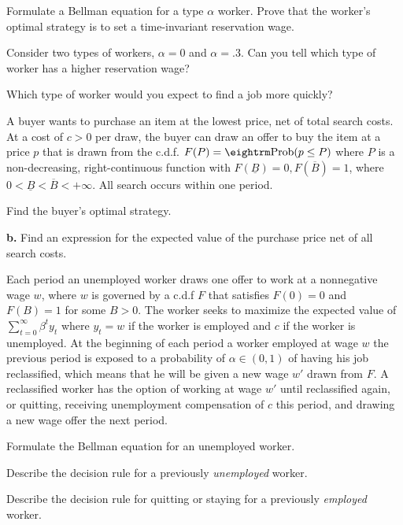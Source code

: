  \medskip
   Formulate a Bellman equation for a type $\alpha$ worker.  Prove that the worker's optimal
 strategy is to set a time-invariant reservation wage.

 \medskip
   Consider two types of workers, $\alpha = 0$ and $\alpha = .3$.  Can you tell which type of worker has a higher
 reservation wage?

 \medskip
   Which type of worker would you expect to find a job more quickly?


\medskip
{} 
\medskip
\noindent
A buyer wants to purchase an item at the  lowest price, net of total search costs. At a cost of $c>0$ per draw, the buyer can
draw an offer to buy the item at a price $p$ that is drawn from the c.d.f. $F(P) = {\rm Prob}(p \leq P)$ where $P$ is a non-decreasing,
right-continuous function with $F(\underline B)=0, F(\overline B) =1$, where $0 < \underline B < \overline B < +\infty$.  All search occurs within one period.

\medskip
{}  Find the buyer's optimal strategy.

\medskip\noindent
{\bf b.} Find an expression for the expected value of the purchase price net of all
search costs.


\medskip
{} 
\medskip
\noindent Each period an unemployed worker draws one offer to work at a nonnegative wage $w$, where $w$ is governed by
a c.d.f $F$ that satisfies $F(0)= 0$ and $F(B) = 1$ for some $B >0$. The worker seeks to maximize the expected value
of $\sum_{t=0}^\infty \beta^t y_t$ where $y_t =w$ if the worker is employed and $c$ if the worker is unemployed.
At the beginning of each period a worker employed at wage $w$ the previous period is exposed to a probability of
$\alpha \in (0,1)$ of having his job reclassified, which means that he will be given a new wage $w'$ drawn from $F$.  A reclassified worker has the
option of working at wage $w'$ until reclassified again, or quitting, receiving unemployment compensation of $c$ this period, and drawing
a new wage offer the next period.

\medskip
{}  Formulate the Bellman equation for an unemployed worker.

\medskip
{} Describe the decision rule for a previously {\it unemployed\/} worker.

\medskip
{} Describe the decision rule for quitting or staying for a previously {\it employed\/} worker.

